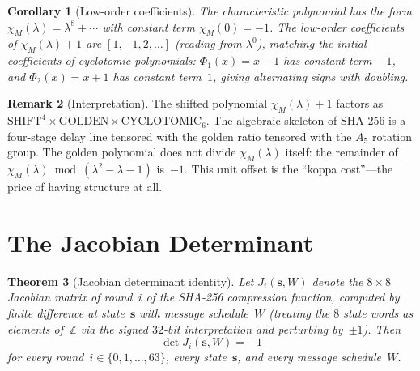 \documentclass[12pt, a4paper]{article}
\theoremstyle{plain}
\newtheorem{theorem}{Theorem}[section]
\newtheorem{corollary}[theorem]{Corollary}
\theoremstyle{definition}
\newtheorem{remark}[theorem]{Remark}
\newcommand{\Z}{\mathbb{Z}}
\newcommand{\charpoly}{\chi_M}
\begin{document}
\begin{corollary}[Low-order coefficients]\label{cor:low-order}
The characteristic polynomial has the form
$\charpoly(\lambda)=\lambda^{8}+\cdots$ with constant term
$\charpoly(0)=-1$.
The low-order coefficients of $\charpoly(\lambda)+1$ are
$[1,-1,2,\ldots]$ (reading from $\lambda^{0}$), matching the
initial coefficients of cyclotomic polynomials: $\Phi_{1}(x)=x-1$
has constant term~$-1$, and $\Phi_{2}(x)=x+1$ has constant
term~$1$, giving alternating signs with doubling.
\end{corollary}

\begin{remark}[Interpretation]
The shifted polynomial $\charpoly(\lambda)+1$ factors as
$\text{SHIFT}^{4}\times\text{GOLDEN}\times\text{CYCLOTOMIC}_{6}$.
The algebraic skeleton of SHA-256 is a four-stage delay line
tensored with the golden ratio tensored with the $A_{5}$ rotation
group.
The golden polynomial does not divide $\charpoly(\lambda)$ itself:
the remainder of $\charpoly(\lambda)\bmod(\lambda^{2}-\lambda-1)$ is~$-1$.
This unit offset is the ``koppa cost''---the price of having
structure at all.
\end{remark}

\section{The Jacobian Determinant}\label{sec:jacobian}

\begin{theorem}[Jacobian determinant identity]\label{thm:det-jacobian}
Let $J_{i}(\mathbf{s},W)$ denote the $8\times 8$ Jacobian matrix
of round~$i$ of the SHA-256 compression function, computed by
finite difference at state~$\mathbf{s}$ with message schedule~$W$
(treating the $8$ state words as elements of~$\Z$ via the signed
$32$-bit interpretation and perturbing by~$\pm 1$).
Then
\begin{equation}\label{eq:det-jacobian}
  \det J_{i}(\mathbf{s},W) = -1
\end{equation}
for every round~$i\in\{0,1,\ldots,63\}$, every state~$\mathbf{s}$,
and every message schedule~$W$.
\end{theorem}
\end{document}
